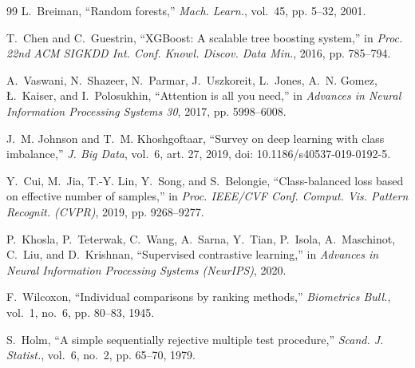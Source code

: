 \documentclass[journal]{IEEEtran}
\begin{document}
\begin{thebibliography}{99}
L.~Breiman, ``Random forests,'' \emph{Mach. Learn.}, vol.~45, pp. 5--32, 2001.

T.~Chen and C.~Guestrin, ``XGBoost: A scalable tree boosting system,'' in \emph{Proc. 22nd ACM SIGKDD Int. Conf. Knowl. Discov. Data Min.}, 2016, pp. 785--794.

A.~Vaswani, N.~Shazeer, N.~Parmar, J.~Uszkoreit, L.~Jones, A.~N. Gomez, {\L}.~Kaiser, and I.~Polosukhin, ``Attention is all you need,'' in \emph{Advances in Neural Information Processing Systems 30}, 2017, pp. 5998--6008.

J.~M. Johnson and T.~M. Khoshgoftaar, ``Survey on deep learning with class imbalance,'' \emph{J. Big Data}, vol.~6, art. 27, 2019, doi: 10.1186/s40537-019-0192-5.

Y.~Cui, M.~Jia, T.-Y. Lin, Y.~Song, and S.~Belongie, ``Class-balanced loss based on effective number of samples,'' in \emph{Proc. IEEE/CVF Conf. Comput. Vis. Pattern Recognit. (CVPR)}, 2019, pp. 9268--9277.

P.~Khosla, P.~Teterwak, C.~Wang, A.~Sarna, Y.~Tian, P.~Isola, A.~Maschinot, C.~Liu, and D.~Krishnan, ``Supervised contrastive learning,'' in \emph{Advances in Neural Information Processing Systems (NeurIPS)}, 2020.

F.~Wilcoxon, ``Individual comparisons by ranking methods,'' \emph{Biometrics Bull.}, vol.~1, no.~6, pp. 80--83, 1945.

S.~Holm, ``A simple sequentially rejective multiple test procedure,'' \emph{Scand. J. Statist.}, vol.~6, no.~2, pp. 65--70, 1979.

\end{thebibliography}
\end{document}
